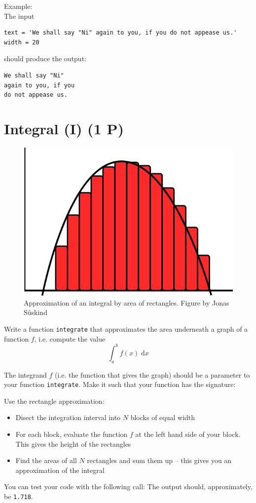 \documentclass[
	english,
	fontsize=10pt,
	parskip=half,
	titlepage=true,
	DIV=12
]{scrartcl}
\newcommand*{\ie}{i.\;e. }
\begin{document}
Example:\\
The input
\begin{verbatim}
text = 'We shall say "Ni" again to you, if you do not appease us.'
width = 20
\end{verbatim}

should produce the output:
\begin{verbatim}
We shall say "Ni" 
again to you, if you 
do not appease us.
\end{verbatim}


\section{Integral (I) (1 P)}
\begin{figure}
	\vspace{-50pt}
	\includegraphics[width=\linewidth]{./integral}
	\caption{Approximation of an integral by area of rectangles.\newline
		Figure by Jonas Süskind}
	\vspace{-30pt}
\end{figure}
Write a function \texttt{integrate} that approximates the area underneath a graph of a function $f$, \ie compute the value
\[ \int_a^b f(x) \;\text{d}x \]

The integrand $f$ (\ie the function that gives the graph) should be a parameter to your function \texttt{integrate}. Make it such that your function has the signature:

Use the rectangle approximation:
\begin{itemize}
\item Disect the integration interval into $N$ blocks of equal width
\item For each block, evaluate the function $f$ at the left hand side of your block. This gives the height of the rectangles
\item Find the areas of all $N$ rectangles and sum them up -- this gives you an approximation of the integral
\end{itemize}

You can test your code with the following call:
The output should, approximately, be \texttt{1.718}.
\end{document}
